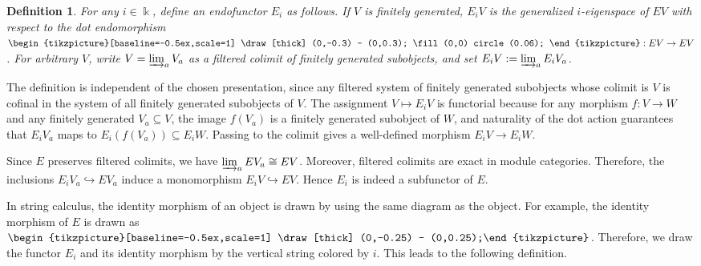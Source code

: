 \documentclass[a4,10pt]{amsart}
\numberwithin{equation}{section}
\newtheorem{Defn}[Theorem]{Definition}
\theoremstyle{definition}
\begin{document}
\begin{Defn}\label{subf}
    For any \(i\in\Bbbk\), define an endofunctor  \(E_i\) as follows.
     If \(V\) is finitely generated, \(E_iV\) is the generalized \(i\)-eigenspace of \(EV\) with respect to the dot endomorphism 
        $
        \begin{tikzpicture}[baseline=-0.5ex,scale=1]
            \draw[thick] (0,-0.3) -- (0,0.3);
            \fill (0,0) circle (0.06);
        \end{tikzpicture} : EV \to EV$.
     For arbitrary \(V\), write \(V = \varinjlim_a V_a\) as a filtered colimit of finitely generated subobjects, and set
        $
        E_iV := \varinjlim_a E_iV_a$.
        \end{Defn}

The definition is independent of the chosen presentation,  since any filtered  system of  finitely generated subobjects whose 
colimit is 
 \(V\) is cofinal in the system of all finitely generated subobjects of $V$.  The assignment \(V \mapsto E_iV\) is functorial because for any morphism \(f:V\to W\) and any finitely generated \(V_a\subseteq V\), the image \(f(V_a)\) is a finitely generated subobject of \(W\), and naturality of the dot action guarantees that \(E_iV_a\) maps to \(E_i(f(V_a))\subseteq E_iW\). Passing to the colimit gives a 
 well-defined morphism \(E_iV \to E_iW\). 

Since \(E\) preserves filtered colimits, we have $\varinjlim_a EV_a\cong EV$. Moreover,  filtered colimits are  exact in module categories. Therefore, the inclusions \(E_iV_a\hookrightarrow E V_a\) induce a monomorphism \(E_iV \hookrightarrow EV\). Hence \(E_i\) is indeed a subfunctor of \(E\).
















 
 
 In string calculus, the identity morphism of an object is drawn by using the same diagram as the object. For example, the identity morphism of $E$
is drawn as $\begin{tikzpicture}[baseline=-0.5ex,scale=1]
		\draw[thick] (0,-0.25) -- (0,0.25);\end{tikzpicture} $. 
Therefore, we  draw the functor  $E_i$ and its identity morphism by the vertical string colored by $i$. 
This leads to the following definition.
\end{document}
